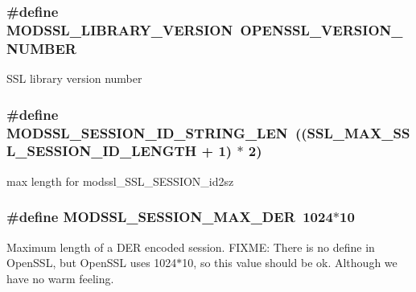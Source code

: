 \subsubsection[{\texorpdfstring{M\+O\+D\+S\+S\+L\+\_\+\+L\+I\+B\+R\+A\+R\+Y\+\_\+\+V\+E\+R\+S\+I\+ON}{MODSSL_LIBRARY_VERSION}}]{\setlength{\rightskip}{0pt plus 5cm}\#define M\+O\+D\+S\+S\+L\+\_\+\+L\+I\+B\+R\+A\+R\+Y\+\_\+\+V\+E\+R\+S\+I\+ON~O\+P\+E\+N\+S\+S\+L\+\_\+\+V\+E\+R\+S\+I\+O\+N\+\_\+\+N\+U\+M\+B\+ER}\hypertarget{group__MOD__SSL__UTIL_ga69e719c4e3cc5f9d8038c18a7240482f}{}\label{group__MOD__SSL__UTIL_ga69e719c4e3cc5f9d8038c18a7240482f}
S\+SL library version number 
\subsubsection[{\texorpdfstring{M\+O\+D\+S\+S\+L\+\_\+\+S\+E\+S\+S\+I\+O\+N\+\_\+\+I\+D\+\_\+\+S\+T\+R\+I\+N\+G\+\_\+\+L\+EN}{MODSSL_SESSION_ID_STRING_LEN}}]{\setlength{\rightskip}{0pt plus 5cm}\#define M\+O\+D\+S\+S\+L\+\_\+\+S\+E\+S\+S\+I\+O\+N\+\_\+\+I\+D\+\_\+\+S\+T\+R\+I\+N\+G\+\_\+\+L\+EN~((S\+S\+L\+\_\+\+M\+A\+X\+\_\+\+S\+S\+L\+\_\+\+S\+E\+S\+S\+I\+O\+N\+\_\+\+I\+D\+\_\+\+L\+E\+N\+G\+TH + 1) $\ast$ 2)}\hypertarget{group__MOD__SSL__UTIL_ga536fe93cdb182005c2482441ea973f16}{}\label{group__MOD__SSL__UTIL_ga536fe93cdb182005c2482441ea973f16}
max length for modssl\+\_\+\+S\+S\+L\+\_\+\+S\+E\+S\+S\+I\+O\+N\+\_\+id2sz 
\subsubsection[{\texorpdfstring{M\+O\+D\+S\+S\+L\+\_\+\+S\+E\+S\+S\+I\+O\+N\+\_\+\+M\+A\+X\+\_\+\+D\+ER}{MODSSL_SESSION_MAX_DER}}]{\setlength{\rightskip}{0pt plus 5cm}\#define M\+O\+D\+S\+S\+L\+\_\+\+S\+E\+S\+S\+I\+O\+N\+\_\+\+M\+A\+X\+\_\+\+D\+ER~1024$\ast$10}\hypertarget{group__MOD__SSL__UTIL_ga33ff82b5abee9e2a133dbc1108e40688}{}\label{group__MOD__SSL__UTIL_ga33ff82b5abee9e2a133dbc1108e40688}
Maximum length of a D\+ER encoded session. F\+I\+X\+ME\+: There is no define in Open\+S\+SL, but Open\+S\+SL uses 1024$\ast$10, so this value should be ok. Although we have no warm feeling. 

